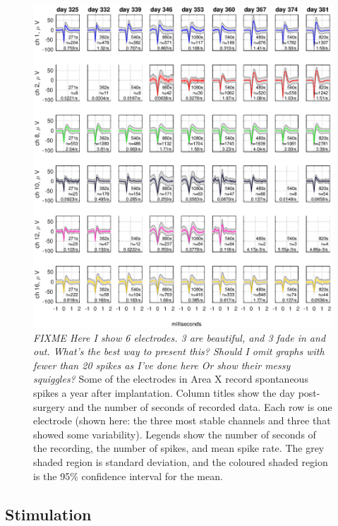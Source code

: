 \documentclass[10pt,letterpaper]{article}
\begin{document}
\begin{figure}
  \includegraphics[width=\textwidth]{XSpikeRecording}
  \caption{{\em FIXME Here I show 6 electrodes.  3 are beautiful, and
      3 fade in and out.  What's the best way to present this?  Should
      I omit graphs with fewer than 20 spikes as I've done here Or
      show their messy squiggles?}  Some of the electrodes in Area X
    record spontaneous spikes a year after implantation.  Column
    titles show the day post-surgery and the number of seconds of
    recorded data.  Each row is one electrode (shown here: the three
    most stable channels and three that showed some variability).
    Legends show the number of seconds of the recording, the number of
    spikes, and mean spike rate.  The grey shaded region is standard
    deviation, and the coloured shaded region is the 95\% confidence
    interval for the mean.}
  \label{fig:XSpikeRecording}
\end{figure}




\subsection{Stimulation}
\end{document}
